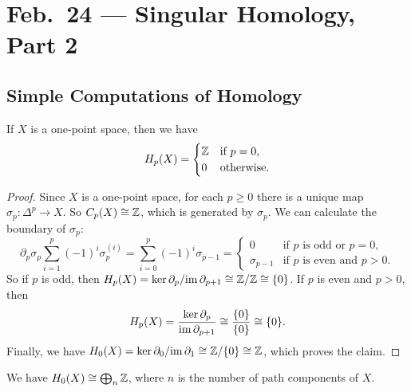 \chapter{Feb.~24 --- Singular Homology, Part 2}

\section{Simple Computations of Homology}

\begin{lemma}
  If $X$ is a one-point space, then we have
  \[
    H_p(X) =
    \begin{cases}
      \mathbb{Z} & \text{if $p = 0$}, \\
      0 & \text{otherwise}.
    \end{cases}
  \]
\end{lemma}

\begin{proof}
  Since $X$ is a one-point space, for each $p \ge 0$
  there is a unique map $\sigma_p : \Delta^p \to X$.
  So $C_p(X) \cong \mathbb{Z}$, which is generated by $\sigma_p$.
  We can calculate the boundary of $\sigma_p$:
  \[
    \partial_p \sigma_p \sum_{i = 1}^p (-1)^i \sigma_p^{(i)}
    = \sum_{i = 0}^p (-1)^i \sigma_{p - 1}
    =
    \begin{cases}
      0 & \text{if $p$ is odd or $p = 0$}, \\
      \sigma_{p - 1} & \text{if $p$ is even and $p > 0$}.
    \end{cases}
  \]
  So if $p$ is odd, then $H_p(X) = \ker \partial_p / {\operatorname{im} \partial_{p + 1}} \cong \mathbb{Z} / \mathbb{Z} \cong \{0\}$.
  If $p$ is even and $p > 0$, then
  \[H_p(X) = \frac{\ker \partial_p}{\operatorname{im} \partial_{p + 1}} \cong \frac{\{0\}}{\{0\}} \cong \{0\}.\]
  Finally, we have $H_0(X) = \ker \partial_0 / {\operatorname{im} \partial_1} \cong \mathbb{Z} / \{0\} \cong \mathbb{Z}$, which proves
  the claim.
\end{proof}

\begin{theorem}
  We have $H_0(X) \cong \bigoplus_n \mathbb{Z}$,
  where $n$ is the number of path components of $X$.
\end{theorem}

